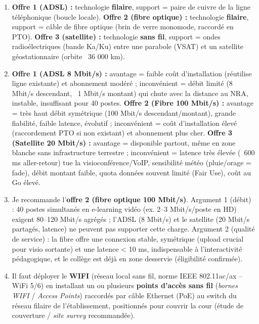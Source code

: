 \documentclass[11pt]{article}
\begin{document}
\begin{corrige}
\begin{enumerate}
    \item \textbf{Offre 1 (ADSL) :} technologie \textbf{filaire}, support = paire de cuivre de la ligne téléphonique (boucle locale). \textbf{Offre 2 (fibre optique) :} technologie \textbf{filaire}, support = câble de fibre optique (brin de verre monomode, raccordé en PTO). \textbf{Offre 3 (satellite) :} technologie \textbf{sans fil}, support = ondes radioélectriques (bande Ka/Ku) entre une parabole (VSAT) et un satellite géostationnaire (orbite ~36 000 km).
    \item \textbf{Offre 1 (ADSL 8 Mbit/s) :} avantage = faible coût d'installation (réutilise ligne existante) et abonnement modéré ; inconvénient = débit limité (8 Mbit/s descendant, ~1 Mbit/s montant) qui chute avec la distance au NRA, instable, insuffisant pour 40 postes. \textbf{Offre 2 (Fibre 100 Mbit/s) :} avantage = très haut débit symétrique (100 Mbit/s descendant/montant), grande fiabilité, faible latence, évolutif ; inconvénient = coût d'installation élevé (raccordement PTO si non existant) et abonnement plus cher. \textbf{Offre 3 (Satellite 20 Mbit/s) :} avantage = disponible partout, même en zone blanche sans infrastructure terrestre ; inconvénient = latence très élevée (~600 ms aller-retour) tue la visioconférence/VoIP, sensibilité météo (pluie/orage = fade), débit montant faible, quota données souvent limité (Fair Use), coût au Go élevé.
    \item Je recommande l'\textbf{offre 2 (fibre optique 100 Mbit/s)}. Argument 1 (débit) : 40 postes simultanés en e-learning vidéo (ex. 2--3 Mbit/s/poste en HD) exigent 80--120 Mbit/s agrégés ; l'ADSL (8 Mbit/s) et le satellite (20 Mbit/s partagés, latence) ne peuvent pas supporter cette charge. Argument 2 (qualité de service) : la fibre offre une connexion stable, symétrique (upload crucial pour visio sortante) et une latence < 10 ms, indispensable à l'interactivité pédagogique, et le collège est déjà en zone desservie (éligibilité confirmée).
    \item Il faut déployer le \textbf{WIFI} (réseau local sans fil, norme IEEE 802.11ac/ax -- WiFi 5/6) en installant un ou plusieurs \textbf{points d'accès sans fil} (\emph{bornes WIFI} / \emph{Access Points}) raccordés par câble Ethernet (PoE) au switch du réseau filaire de l'établissement, positionnés pour couvrir la cour (étude de couverture / \emph{site survey} recommandée).

\end{enumerate}
\end{corrige}
\end{document}
